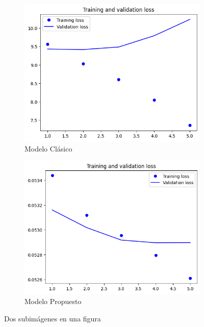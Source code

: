 \documentclass[runningheads]{llncs}
\begin{document}
\begin{figure}[h!]
	\centering
	\begin{subfigure}[b]{0.45\textwidth}
		\centering
		\includegraphics[width=\textwidth]{clasica.png}
		\caption{Modelo Clásico}
		\label{fig:sub1}
	\end{subfigure}
	\hfill
	\begin{subfigure}[b]{0.45\textwidth}
		\centering
		\includegraphics[width=\textwidth]{propuesta.png}
		\caption{Modelo Propuesto}
		\label{fig:sub2}
	\end{subfigure}
	\caption{Dos subimágenes en una figura}
	\label{fig:imagen_completa}
\end{figure}
\end{document}
